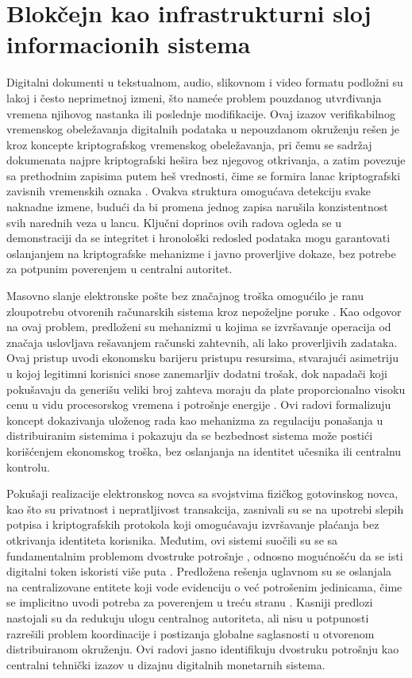 \chapter{Blokčejn kao infrastrukturni sloj informacionih sistema}
Digitalni dokumenti u tekstualnom, audio, slikovnom i video formatu podložni su lakoj i često neprimetnoj izmeni, što nameće problem pouzdanog utvrđivanja vremena njihovog nastanka ili poslednje modifikacije. Ovaj izazov verifikabilnog vremenskog obeležavanja digitalnih podataka u nepouzdanom okruženju rešen je kroz koncepte kriptografskog vremenskog obeležavanja, pri čemu se sadržaj dokumenata najpre kriptografski hešira bez njegovog otkrivanja, a zatim povezuje sa prethodnim zapisima putem heš vrednosti, čime se formira lanac kriptografski zavisnih vremenskih oznaka \cite{haber1990time, bayer1993improving, massias2002timestamp}. Ovakva struktura omogućava detekciju svake naknadne izmene, budući da bi promena jednog zapisa narušila konzistentnost svih narednih veza u lancu. Ključni doprinos ovih radova ogleda se u demonstraciji da se integritet i hronološki redosled podataka mogu garantovati oslanjanjem na kriptografske mehanizme i javno proverljive dokaze, bez potrebe za potpunim poverenjem u centralni autoritet.

Masovno slanje elektronske pošte bez značajnog troška omogućilo je ranu zloupotrebu otvorenih računarskih sistema kroz nepoželjne poruke . Kao odgovor na ovaj problem, predloženi su mehanizmi u kojima se izvršavanje operacija od značaja uslovljava rešavanjem računski zahtevnih, ali lako proverljivih zadataka. Ovaj pristup uvodi ekonomsku barijeru pristupu resursima, stvarajući asimetriju u kojoj legitimni korisnici snose zanemarljiv dodatni trošak, dok napadači koji pokušavaju da generišu veliki broj zahteva moraju da plate proporcionalno visoku cenu u vidu procesorskog vremena i potrošnje energije \cite{Dwork1992PricingVP, back2002hashcash}. Ovi radovi formalizuju koncept dokazivanja uloženog rada kao mehanizma za regulaciju ponašanja u distribuiranim sistemima i pokazuju da se bezbednost sistema može postići korišćenjem ekonomskog troška, bez oslanjanja na identitet učesnika ili centralnu kontrolu.

Pokušaji realizacije elektronskog novca sa svojstvima fizičkog gotovinskog novca, kao što su privatnost i nepratljivost transakcija, zasnivali su se na upotrebi slepih potpisa i kriptografskih protokola koji omogućavaju izvršavanje plaćanja bez otkrivanja identiteta korisnika. Međutim, ovi sistemi suočili su se sa fundamentalnim problemom dvostruke potrošnje , odnosno mogućnošću da se isti digitalni token iskoristi više puta \cite{chaum1983blind}. Predložena rešenja uglavnom su se oslanjala na centralizovane entitete koji vode evidenciju o već potrošenim jedinicama, čime se implicitno uvodi potreba za poverenjem u treću stranu \cite{chaum1985security}. Kasniji predlozi \cite{szabo2005bit, dai1998b} nastojali su da redukuju ulogu centralnog autoriteta, ali nisu u potpunosti razrešili problem koordinacije i postizanja globalne saglasnosti u otvorenom distribuiranom okruženju. Ovi radovi jasno identifikuju dvostruku potrošnju kao centralni tehnički izazov u dizajnu digitalnih monetarnih sistema.

